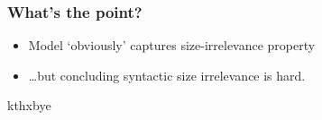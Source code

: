 \documentclass[xetex]{beamer}
\begin{document}
\begin{frame}
  \frametitle{What's the point?}

  \begin{itemize}
    \item<1-> Model \enquote*{obviously} captures size-irrelevance property
    \item<2-> \dots but concluding syntactic size irrelevance is hard.
  \end{itemize}
\end{frame}


\begin{frame}
  \centering
  kthxbye
\end{frame}
\end{document}
